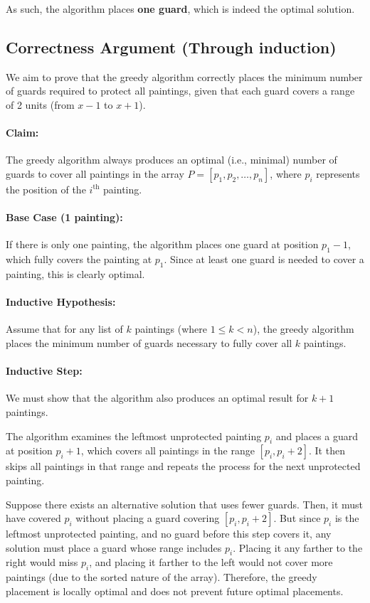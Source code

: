 \documentclass[12pt]{article}
\begin{document}
As such, the algorithm places \textbf{one guard}, which is indeed the optimal solution.

\subsection*{Correctness Argument (Through induction)}

We aim to prove that the greedy algorithm correctly places the minimum number of guards required to protect all paintings, given that each guard covers a range of 2 units (from $x - 1$ to $x + 1$).

\paragraph{Claim:} The greedy algorithm always produces an optimal (i.e., minimal) number of guards to cover all paintings in the array $P = [p_1, p_2, \dots, p_n]$, where $p_i$ represents the position of the $i^{\text{th}}$ painting.

\paragraph{Base Case (1 painting):}  
If there is only one painting, the algorithm places one guard at position $p_1 - 1$, which fully covers the painting at $p_1$. Since at least one guard is needed to cover a painting, this is clearly optimal.

\paragraph{Inductive Hypothesis:}  
Assume that for any list of $k$ paintings (where $1 \leq k < n$), the greedy algorithm places the minimum number of guards necessary to fully cover all $k$ paintings.

\paragraph{Inductive Step:}  
We must show that the algorithm also produces an optimal result for $k + 1$ paintings.

The algorithm examines the leftmost unprotected painting $p_i$ and places a guard at position $p_i + 1$, which covers all paintings in the range $[p_i, p_i + 2]$. It then skips all paintings in that range and repeats the process for the next unprotected painting.

Suppose there exists an alternative solution that uses fewer guards. Then, it must have covered $p_i$ without placing a guard covering $[p_i, p_i + 2]$. But since $p_i$ is the leftmost unprotected painting, and no guard before this step covers it, any solution must place a guard whose range includes $p_i$. Placing it any farther to the right would miss $p_i$, and placing it farther to the left would not cover more paintings (due to the sorted nature of the array). Therefore, the greedy placement is locally optimal and does not prevent future optimal placements.
\end{document}
